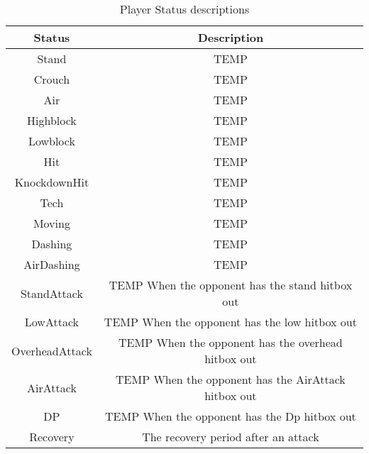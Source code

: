 \documentclass{article}
\begin{document}
\begin{table}[h]
	\centering
	\caption{Player Status descriptions}
	\begin{tabular}{| c | c |}
		\hline
		Status & Description \\
		\hline
		Stand & TEMP \\
		\hline
		Crouch & TEMP \\
		\hline
		Air & TEMP \\
		\hline
		Highblock & TEMP \\
		\hline
		Lowblock & TEMP \\
		\hline
		Hit & TEMP \\
		\hline
		KnockdownHit & TEMP \\
		\hline
		Tech & TEMP \\
		\hline
		Moving & TEMP \\
		\hline
		Dashing & TEMP \\
		\hline
		AirDashing & TEMP \\
		\hline
		StandAttack & TEMP When the opponent has the stand hitbox out\\
		\hline 
		LowAttack & TEMP When the opponent has the low hitbox out\\
		\hline 
		OverheadAttack & TEMP When the opponent has the overhead hitbox out\\
		\hline 
		AirAttack & TEMP  When the opponent has the AirAttack hitbox out\\
		\hline
		DP& TEMP When the opponent has the Dp hitbox out\\
		\hline 
		Recovery & The recovery period after an attack\\
		\hline
	\end{tabular}
\end{table}
\end{document}
